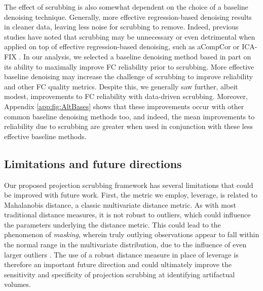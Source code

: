 \documentclass{article}
\begin{document}
The effect of scrubbing is also somewhat dependent on the choice of a baseline denoising technique.  Generally, more effective regression-based denoising results in cleaner data, leaving less noise for scrubbing to remove. Indeed, previous studies have noted that scrubbing may be unnecessary or even detrimental when applied on top of effective regression-based denoising, such as aCompCor or ICA-FIX \citep{muschelliReductionMotionrelatedArtifacts2014, Cho2021ImpactConnectomics}. In our analysis, we selected a baseline denoising method based in part on its ability to maximally improve FC reliability prior to scrubbing. More effective baseline denoising may increase the challenge of scrubbing to improve reliability and other FC quality metrics. Despite this, we generally saw further, albeit modest, improvements to FC reliability with data-driven scrubbing. Moreover, Appendix \autoref{app:fig:AltBases} shows that these improvements occur with other common baseline denoising methods too, and indeed, the mean improvements to reliability due to scrubbing are greater when used in conjunction with these less effective baseline methods. 

\subsection{Limitations and future directions}

Our proposed projection scrubbing framework has several limitations that could be improved with future work. First, the metric we employ, leverage, is related to Mahalanobis distance, a classic multivariate distance metric. As with most traditional distance measures, it is not robust to outliers, which could influence the parameters underlying the distance metric. This could lead to the phenomenon of \textit{masking}, wherein truly outlying observations appear to fall within the normal range in the multivariate distribution, due to the influence of even larger outliers \citep{rousseeuw1990unmasking}. The use of a robust distance measure in place of leverage is therefore an important future direction and could ultimately improve the sensitivity and specificity of projection scrubbing at identifying artifactual volumes. 
\end{document}
